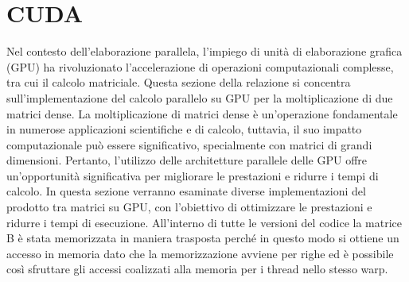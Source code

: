\documentclass[conference]{IEEEtran}
\begin{document}
\section{CUDA}
Nel contesto dell'elaborazione parallela, l'impiego di unità di elaborazione grafica (GPU) ha rivoluzionato l'accelerazione di operazioni computazionali complesse, tra cui il calcolo matriciale. Questa sezione della relazione si concentra sull'implementazione del calcolo parallelo su GPU per la moltiplicazione di due matrici dense. La moltiplicazione di matrici dense è un'operazione fondamentale in numerose applicazioni scientifiche e di calcolo, tuttavia, il suo impatto computazionale può essere significativo, specialmente con matrici di grandi dimensioni. Pertanto, l'utilizzo delle architetture parallele delle GPU offre un'opportunità significativa per migliorare le prestazioni e ridurre i tempi di calcolo. In questa sezione verranno esaminate diverse implementazioni del prodotto tra matrici su GPU, con l'obiettivo di ottimizzare le prestazioni e ridurre i tempi di esecuzione. All'interno di tutte le versioni del codice la matrice B è stata memorizzata in maniera trasposta perché in questo modo si ottiene un accesso in memoria dato che la memorizzazione avviene per righe ed è possibile così sfruttare gli accessi coalizzati alla memoria per i thread nello stesso warp.
\end{document}
